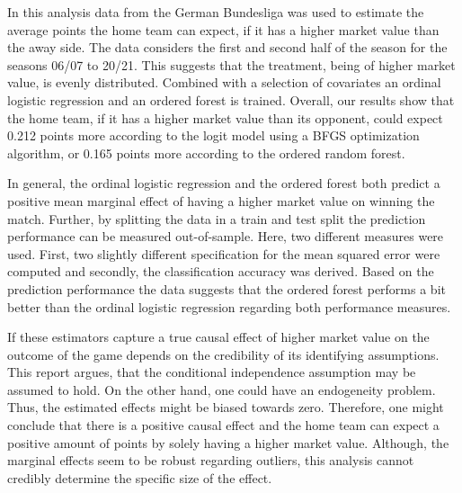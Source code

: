 \documentclass[11pt]{article}
\begin{document}
In this analysis data from the German Bundesliga was used to estimate the average points the home team can expect, if it has a higher market value than the away side. The data considers the first and second half of the season for the seasons 06/07 to 20/21. This suggests that the treatment, being of higher market value, is evenly distributed. Combined with a selection of covariates an ordinal logistic regression and an ordered forest is trained. Overall, our results show that the home team, if it has a higher market value than its opponent, could expect 0.212 points more according to the logit model using a BFGS optimization algorithm, or 0.165 points more according to the ordered random forest.

In general, the ordinal logistic regression and the ordered forest both predict a positive mean marginal effect of having a higher market value on winning the match. Further, by splitting the data in a train and test split the prediction performance can be measured out-of-sample. Here, two different measures were used. First, two slightly different specification for the mean squared error were computed and secondly, the classification accuracy was derived. Based on the prediction performance the data suggests that the ordered forest performs a bit better than the ordinal logistic regression regarding both performance measures.

If these estimators capture a true causal effect of higher market value on the outcome of the game depends on the credibility of its identifying assumptions. This report argues, that the conditional independence assumption may be assumed to hold. On the other hand, one could have an endogeneity problem. Thus, the estimated effects might be biased towards zero. Therefore, one might conclude that there is a positive causal effect and the home team can expect a positive amount of points by solely having a higher market value. Although, the marginal effects seem to be robust regarding outliers, this analysis cannot credibly determine the specific size of the effect.

\pagebreak



\end{document}
